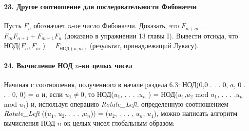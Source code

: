 \documentclass{mai_book}
\begin{document}
\noindent\textbf{23. Другое соотношение для последовательности Фибоначчи}\\\\
\hspace*{10pt}Пусть $F_n$ обозначает $n$-ое число Фибоначчи. Доказать, что $F_{n +m}$ =\linebreak
$F_m F_{n+1}+F_{m-1}F_n$ (доказано в упражнении 13 главы I). Вывести отсюда,\linebreak
что НОД($F_n, F_m$ ) = $F_{\text{НОД}(n, m)}$ (результат, принадлежащий Лукасу).\\\\
\noindent\textbf{24. Вычисление НОД $n$-ки целых чисел}\\
\\
\noindent\hspace*{10pt} Начиная с соотношения, полученного в начале раздела 6.3:\linebreak
НОД(0,0 . . . 0, $a$, 0 . . . 0, 0) = $a$ и, если $u_1\neq 0$, то НОД($u_1$, . . . ,$u_n$ ) =\linebreak
НОД($u_1$,$u_2$ mod $u_1$, . . . ,$u_n$ mod $u_1$) и, используя операцию \textit{Rotate\_Left}, \linebreak
определенную соотношением \textit{Rotate\_Left} (($u_1$, $u_2$, . . . ,$u_n$)) = ($u_2$, . . . ,\linebreak
$u_n$, $u_1$), можно написать алгоритм вычисления НОД $n$-ок целых чисел\linebreak
глобальным образом:
\end{document}
